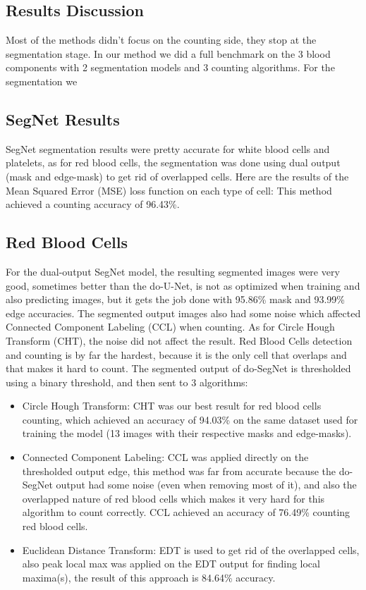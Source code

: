\documentclass[conference]{IEEEtran}
\begin{document}
\subsection{Results Discussion}
Most of the methods didn’t focus on the counting side, they stop at the segmentation stage. In our method we did a full benchmark on the 3 blood components with 2 segmentation models and 3 counting algorithms. For the segmentation we 
\subsection{SegNet Results}
SegNet segmentation results were pretty accurate for white blood cells and platelets, as for red blood cells, the segmentation was done using dual output (mask and edge-mask) to get rid of overlapped cells.
Here are the results of the Mean Squared Error (MSE) loss function on each type of cell:
This method achieved a counting accuracy of 96.43\%.
\subsection{Red Blood Cells}
For the dual-output SegNet model, the resulting segmented images were very good, sometimes better than the do-U-Net, is not as optimized when training and also predicting images, but it gets the job done with 95.86\% mask and 93.99\% edge accuracies. The segmented output images also had some noise which affected Connected Component Labeling (CCL) when counting. As for Circle Hough Transform (CHT), the noise did not affect the result. Red Blood Cells detection and counting is by far the hardest, because it is the only cell that overlaps and that makes it hard to count. The segmented output of do-SegNet is thresholded using a binary threshold, and then sent to 3 algorithms:
\begin{itemize}
\item Circle Hough Transform: CHT was our best result for red blood cells counting, which achieved an accuracy of 94.03\% on the same dataset used for training the model (13 images with their respective masks and edge-masks).
\item Connected Component Labeling: CCL was applied directly on the thresholded output edge, this method was far from accurate because the do-SegNet output had some noise (even when removing most of it), and also the overlapped nature of red blood cells which makes it very hard for this algorithm to count correctly. CCL achieved an accuracy of 76.49\% counting red blood cells.
\item Euclidean Distance Transform: EDT is used to get rid of the overlapped cells, also peak local max was applied on the EDT output for finding local maxima(s), the result of this approach is 84.64\% accuracy.
\end{itemize}
\end{document}
